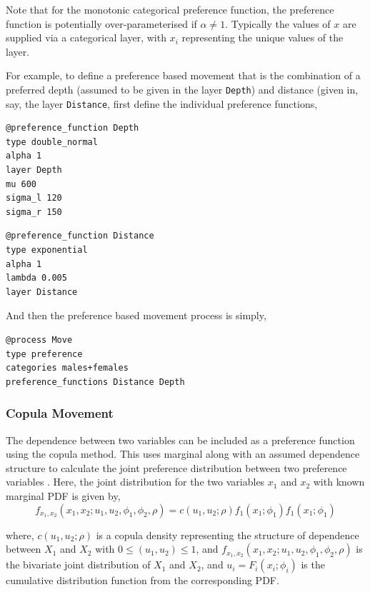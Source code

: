 \begin{enumerate}
Note that for the monotonic categorical preference function, the preference function is potentially over-parameterised if $\alpha \ne 1$. Typically the values of $x$ are supplied via a categorical layer, with $x_i$ representing the unique values of the layer.

\end{enumerate}

For example, to define a preference based movement that is the combination of a preferred depth (assumed to be given in the layer \texttt{Depth}) and distance (given in, say, the layer \texttt{Distance}, first define the individual preference functions,

{\small{\begin{verbatim}
@preference_function Depth
type double_normal
alpha 1
layer Depth
mu 600
sigma_l 120
sigma_r 150
\end{verbatim}}}

{\small{\begin{verbatim}
@preference_function Distance
type exponential
alpha 1
lambda 0.005
layer Distance
\end{verbatim}}}

And then the preference based movement process is simply,

{\small{\begin{verbatim}
@process Move
type preference
categories males+females
preference_functions Distance Depth
\end{verbatim}}}

\subsubsection*{Copula Movement}

The dependence between two variables can be included as a preference function using the copula method. This uses marginal  along with an assumed dependence structure to calculate the joint preference distribution between two preference variables \citep{Marsh2015}. Here, the joint distribution for the two variables $x_1$ and $x_2$ with known marginal PDF is given by,
\begin{equation}
  f_{x_1,x_2}(x_1,x_2;u_1,u_2,\phi_1,\phi_2,\rho) = c(u_1,u_2;\rho)f_1(x_1;\phi_1)f_1(x_1;\phi_1)
\end{equation}

where, $c(u_1,u_2;\rho)$ is a copula density representing the structure of dependence between $X_1$ and $X_2$ with $0\leq (u_1,u_2) \leq 1$, and $f_{x_1,x_2}(x_1,x_2;u_1,u_2,\phi_1,\phi_2,\rho)$ is the bivariate joint distribution of $X_1$ and $X_2$, and $u_i = F_i(x_i;\phi_i)$ is the cumulative distribution function from the corresponding PDF.

